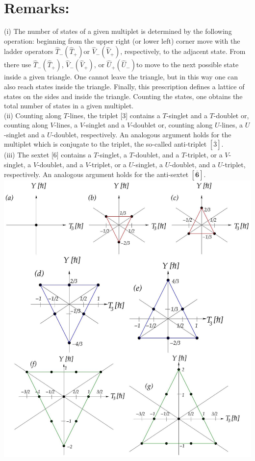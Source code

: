 \documentclass[10pt, letterpaper]{article}
\begin{document}
\section{Remarks:}
(i) The number of states of a given multiplet is determined by the following operation: beginning from the upper right (or lower left) corner move with the ladder operators $\hat{T}_{-}\left(\hat{T}_{+}\right)$or $\hat{V}_{-}\left(\hat{V}_{+}\right)$, respectively, to the adjacent state. From there use $\hat{T}_{-}\left(\hat{T}_{+}\right)$, $\hat{V}_{-}\left(\hat{V}_{+}\right)$, or $\hat{U}_{+}\left(\hat{U}_{-}\right)$to move to the next possible state inside a given triangle. One cannot leave the triangle, but in this way one can also reach states inside the triangle. Finally, this prescription defines a lattice of states on the sides and inside the triangle. Counting the states, one obtains the total number of states in a given multiplet.\\
(ii) Counting along $T$-lines, the triplet [3] contains a $T$-singlet and a $T$-doublet or, counting along $V$-lines, a $V$-singlet and a $V$-doublet or, counting along $U$-lines, a $U$-singlet and a $U$-doublet, respectively. An analogous argument holds for the multiplet which is conjugate to the triplet, the so-called anti-triplet $[\overline{3}]$.\\[0pt]
(iii) The sextet [6] contains a $T$-singlet, a $T$-doublet, and a $T$-triplet, or a $V$-singlet, a $V$-doublet, and a $V$-triplet, or a $U$-singlet, a $U$-doublet, and a $U$-triplet, respectively. An analogous argument holds for the anti-sextet $[\overline{\mathbf{6}}]$.\\
\includegraphics[scale=0.3, center]{2025_05_20_8618f55a41bfe980b4b2g-49}
\end{document}
